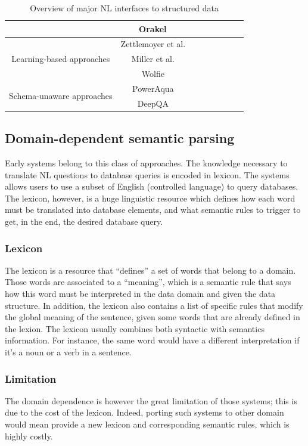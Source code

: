 \documentclass[10pt,journal,letterpaper,compsoc]{IEEEtran}
\begin{document}
\begin{table}
\begin{tabular}{|c|c|c|c|c|c|c|c|}
& {\sc
Orakel}~\cite{Cimiano:2007:PNL:1216295.1216330} & & & & & & \\\hline
\multirow{3}{*}{Learning-based approaches} & Zettlemoyer
et al.~\cite{DBLP:conf/uai/ZettlemoyerC05} & & & & & & \\\cline{2-8}
& Miller et al.~\cite{Miller:1996:FSA:981863.981871} & & & & & & \\\cline{2-8}
& {\sc Wolfie}~\cite{Thompson:2003:AWM:1622420.1622421} & & & & & &
\\\hline
\multirow{2}{*}{Schema-unaware approaches} & {\sc
PowerAqua}~\cite{DBLP:conf/esws/LopezMU06} & & & & & & \\\cline{2-8}
 & {\sc DeepQA}~\cite{DBLP:journals/aim/FerrucciBCFGKLMNPSW10} & & & & & &
 \\\hline
\end{tabular}
\caption{Overview of major NL interfaces to structured data}
\label{tab:overview}
\end{table}

\subsection{Domain-dependent semantic parsing}
Early systems belong to this class of approaches.
The knowledge necessary to translate NL questions to database queries
is encoded in lexicon.
The systems allows users to use a subset of English (controlled language) to
query databases. 
The lexicon, however, is a huge linguistic resource which defines how each word
must be translated into database elements, and what semantic rules to trigger to
get, in the end, the desired database query.



\subsubsection{Lexicon}
The lexicon is a resource that ``defines'' a set of words that belong to a
domain. Those words are associated to a ``meaning'', which is a semantic rule
that says how this word must be interpreted in the data domain and given
the data structure.
In addition, the lexicon also contains a list of specific rules that modify 
the global meaning of the sentence, given some words that are already defined in
the lexion.
The lexicon usually combines both syntactic with semantics information.
For instance, the same word would have a different interpretation if it's a noun
or a verb in a sentence. 

\subsubsection{Limitation}
The domain dependence is however the great limitation of those systems; this is
due to the cost of the lexicon. Indeed, porting such systems to other domain
would mean provide a new lexicon and corresponding semantic rules, which is
highly costly.
\end{document}
